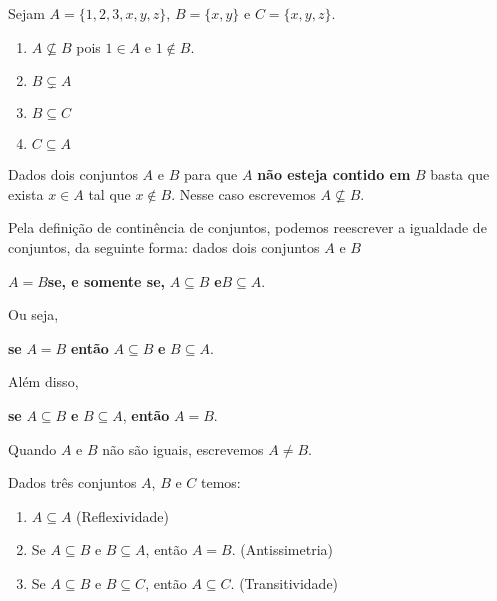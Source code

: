 \documentclass{beamer}
\begin{document}
    \begin{frame}
        \begin{exemplos}
            Sejam $A = \{1,2,3,x,y,z\}$, \pause $B = \{x, y\}$ \pause e $C = \{x, y , z\}$.\pause
            \begin{enumerate}[label={\arabic*})]
                \item $A \nsubseteq B$ \pause pois $1 \in A$ e $1 \notin B$.\pause
                \item $B \subsetneq A$\pause
                \item $B \subseteq C$\pause
                \item $C \subseteq A$\pause
            \end{enumerate}
        \end{exemplos}

        \begin{observacao}
            Dados dois conjuntos $A$ e $B$ \pause para que $A$ \textbf{n\~ao esteja contido em} $B$ basta \pause que exista $x \in A$ tal que $x \notin B$. \pause Nesse caso escrevemos $A \nsubseteq B$.
        \end{observacao}
    \end{frame}
    \begin{frame}
        Pela defini\c{c}\~ao de contin\^encia de conjuntos, podemos reescrever a igualdade de conjuntos, da seguinte forma: \pause dados dois conjuntos $A$ e $B$\pause
        \begin{center}
            $A = B$\quad \textbf{se, e somente se,} \pause\quad $A \subseteq B$ \quad\pause \textbf{e}\quad $B \subseteq A$.\pause
        \end{center}

        Ou seja,
        \begin{center}
            \textbf{se} $A = B$ \textbf{ent{\~a}o} $A \subseteq B$ \textbf{e} $B \subseteq A$.\pause
        \end{center}

        Al\'em disso,
        \begin{center}
            \textbf{se} $A \subseteq B$ \textbf{e} $B \subseteq A$, \textbf{ent{\~a}o} $A = B$.\pause
        \end{center}

        Quando $A$ e $B$ n{\~a}o s{\~a}o iguais, escrevemos $A \neq B$.\pause

        \begin{proposicao}
            Dados tr\^es conjuntos $A$, $B$ e $C$ temos:\pause
            \begin{enumerate}[label={\roman*})]
                \item $A\subseteq A$ (Reflexividade)\pause
                \item Se $A\subseteq B \mbox{ e } B\subseteq A$, ent{\~a}o $A=B$. (Antissimetria)\pause
                \item Se $A\subseteq B$ e $B\subseteq C$, ent{\~a}o $A\subseteq C$. (Transitividade)\pause
            \end{enumerate}
        \end{proposicao}
    \end{frame}
\end{document}
